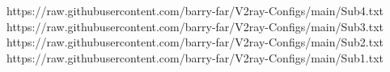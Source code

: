 https://raw.githubusercontent.com/barry-far/V2ray-Configs/main/Sub4.txt
https://raw.githubusercontent.com/barry-far/V2ray-Configs/main/Sub3.txt
https://raw.githubusercontent.com/barry-far/V2ray-Configs/main/Sub2.txt
https://raw.githubusercontent.com/barry-far/V2ray-Configs/main/Sub1.txt
